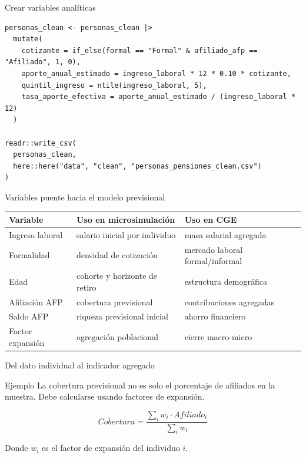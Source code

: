 \documentclass[aspectratio=169,11pt]{beamer}
\begin{document}
\begin{frame}[fragile]{Crear variables analíticas}
\begin{lstlisting}
personas_clean <- personas_clean |>
  mutate(
    cotizante = if_else(formal == "Formal" & afiliado_afp == "Afiliado", 1, 0),
    aporte_anual_estimado = ingreso_laboral * 12 * 0.10 * cotizante,
    quintil_ingreso = ntile(ingreso_laboral, 5),
    tasa_aporte_efectiva = aporte_anual_estimado / (ingreso_laboral * 12)
  )

readr::write_csv(
  personas_clean,
  here::here("data", "clean", "personas_pensiones_clean.csv")
)
\end{lstlisting}
\end{frame}

\begin{frame}{Variables puente hacia el modelo previsional}
\begin{table}
\centering
\small
\begin{tabular}{p{3.6cm} p{4.0cm} p{4.0cm}}
\toprule
Variable & Uso en microsimulación & Uso en CGE \\
\midrule
Ingreso laboral & salario inicial por individuo & masa salarial agregada \\
Formalidad & densidad de cotización & mercado laboral formal/informal \\
Edad & cohorte y horizonte de retiro & estructura demográfica \\
Afiliación AFP & cobertura previsional & contribuciones agregadas \\
Saldo AFP & riqueza previsional inicial & ahorro financiero \\
Factor expansión & agregación poblacional & cierre macro-micro \\
\bottomrule
\end{tabular}
\end{table}
\end{frame}

\begin{frame}{Del dato individual al indicador agregado}
\begin{block}{Ejemplo}
La cobertura previsional no es solo el porcentaje de afiliados en la muestra. Debe calcularse usando factores de expansión.
\end{block}

\vspace{0.3cm}
\[
Cobertura = \frac{\sum_i w_i \cdot Afiliado_i}{\sum_i w_i}
\]

\vspace{0.2cm}
Donde \(w_i\) es el factor de expansión del individuo \(i\).
\end{frame}
\end{document}
